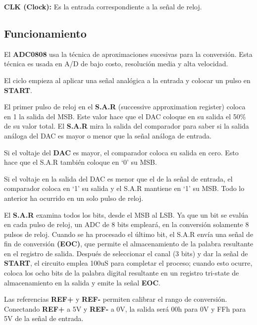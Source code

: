 \documentclass[12pt]{article}
\begin{document}
    \item \textbf{CLK (Clock):} Es la entrada correspondiente a la señal de reloj.
    
        

    
    \subsection{Funcionamiento}
    El \textbf{ADC0808} usa la técnica de aproximaciones sucesivas para la conversión. Esta técnica es usada en A/D de bajo costo, resolución media y alta velocidad.
    
    El ciclo empieza al aplicar una señal analógica a la entrada y colocar un pulso en \textbf{START}. 
    
    El primer pulso de reloj en el \textbf{S.A.R} (successive approximation register) coloca en 1 la salida del MSB. Este valor hace que el DAC  coloque  en  su  salida  el  50\%	de su valor total. El \textbf{S.A.R} mira  la  salida  del comparador  para saber  si  la  salida  análoga del DAC es mayor o menor que la señal análoga de entrada.
    
    Si el voltaje del \textbf{DAC} es mayor, el comparador coloca su salida en cero. Esto hace que el S.A.R también coloque en ‘0’ su MSB.
    
    Si el voltaje en la salida del DAC es menor que el de la señal de entrada, el comparador coloca en ‘1’ su salida y el S.A.R mantiene en ‘1’ su MSB. Todo lo anterior ha ocurrido en un solo pulso de reloj.
    
    El \textbf{S.A.R} examina todos los bits, desde el MSB al LSB. Ya que un bit se evalúa en cada pulso de reloj, un ADC de 8 bits empleará, en la conversión solamente 8 pulsos de reloj. Cuando se ha procesado el último bit, el S.A.R envía una señal de fin de conversión \textbf{(EOC)}, que permite el almacenamiento de la palabra resultante en el registro de salida. Después de seleccionar el canal (3 bits) y dar la señal de \textbf{START}, el circuito emplea 100uS para completar el proceso; cuando esto ocurre, coloca los ocho bits de la palabra digital resultante en un registro tri-state de almacenamiento en la salida y emite la señal \textbf{EOC}.
    
    Las  referencias  \textbf{REF+}  y \textbf{REF-}  permiten  calibrar  el rango de  conversión.  Conectando
    \textbf{REF+} a 5V y \textbf{REF-} a 0V, la salida será 00h para 0V y FFh para 5V de la señal de entrada.
    
\end{document}
